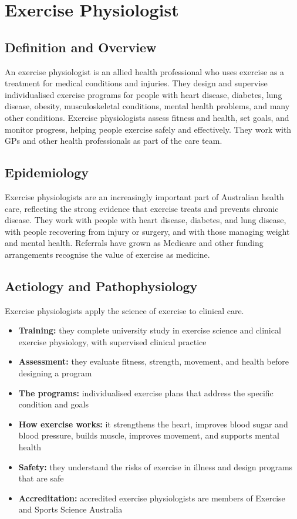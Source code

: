 \chapter{Exercise Physiologist}

\section*{Definition and Overview}
An exercise physiologist is an allied health professional who uses exercise as a treatment for medical conditions and injuries. They design and supervise individualised exercise programs for people with heart disease, diabetes, lung disease, obesity, musculoskeletal conditions, mental health problems, and many other conditions. Exercise physiologists assess fitness and health, set goals, and monitor progress, helping people exercise safely and effectively. They work with GPs and other health professionals as part of the care team.

\section*{Epidemiology}
Exercise physiologists are an increasingly important part of Australian health care, reflecting the strong evidence that exercise treats and prevents chronic disease. They work with people with heart disease, diabetes, and lung disease, with people recovering from injury or surgery, and with those managing weight and mental health. Referrals have grown as Medicare and other funding arrangements recognise the value of exercise as medicine.

\section*{Aetiology and Pathophysiology}
Exercise physiologists apply the science of exercise to clinical care.
\begin{itemize}
    \item \textbf{Training:} they complete university study in exercise science and clinical exercise physiology, with supervised clinical practice
    \item \textbf{Assessment:} they evaluate fitness, strength, movement, and health before designing a program
    \item \textbf{The programs:} individualised exercise plans that address the specific condition and goals
    \item \textbf{How exercise works:} it strengthens the heart, improves blood sugar and blood pressure, builds muscle, improves movement, and supports mental health
    \item \textbf{Safety:} they understand the risks of exercise in illness and design programs that are safe
    \item \textbf{Accreditation:} accredited exercise physiologists are members of Exercise and Sports Science Australia
\end{itemize}


